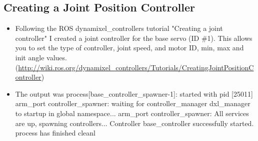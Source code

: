 \documentclass[letterpaper, 10 pt]{article}
\begin{document}
  \subsection{Creating a Joint Position Controller}
    \begin{itemize}
      \item Following the ROS dynamixel\_controllers tutorial "Creating a joint controller" I created a joint controller for the base servo (ID \#1). This allows you to set the type of controller, joint speed, and motor ID, min, max and init angle values. (\url{http://wiki.ros.org/dynamixel\_controllers/Tutorials/CreatingJointPositionController})
      \item The output was \newline
      process[base\_controller\_spawner-1]: started with pid [25011] \newline
[INFO] [WallTime: 1405234746.116965] arm\_port controller\_spawner: waiting for controller\_manager dxl\_manager to startup in global namespace... \newline
[INFO] [WallTime: 1405234746.126165] arm\_port controller\_spawner: All services are up, spawning controllers... \newline
[INFO] [WallTime: 1405234746.202863] Controller base\_controller successfully started.  process has finished cleanl
    \end{itemize}
%

\end{document}

